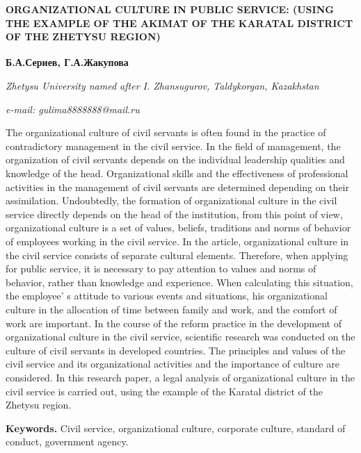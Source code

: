 \begin{articleheader}
{\bfseries ORGANIZATIONAL CULTURE IN PUBLIC SERVICE: (USING THE EXAMPLE OF THE AKIMAT OF THE KARATAL DISTRICT OF THE ZHETYSU REGION)}

{\bfseries
Б.А.Сериев,
Г.А.Жакупова\textsuperscript{\envelope }}
\end{articleheader}

\begin{affiliation}
\emph{Zhetysu University named after I. Zhansugurov, Taldykorgan, Kazakhstan}

\emph{e-mail: gulima8888888@mail.ru}
\end{affiliation}

The organizational culture of civil servants is often found in the
practice of contradictory management in the civil service. In the field
of management, the organization of civil servants depends on the
individual leadership qualities and knowledge of the head.
Organizational skills and the effectiveness of professional activities
in the management of civil servants are determined depending on their
assimilation. Undoubtedly, the formation of organizational culture in
the civil service directly depends on the head of the institution, from
this point of view, organizational culture is a set of values, beliefs,
traditions and norms of behavior of employees working in the civil
service. In the article, organizational culture in the civil service
consists of separate cultural elements. Therefore, when applying for
public service, it is necessary to pay attention to values and norms of
behavior, rather than knowledge and experience. When calculating this
situation, the employee' s attitude to various events and
situations, his organizational culture in the allocation of time between
family and work, and the comfort of work are important. In the course of
the reform practice in the development of organizational culture in the
civil service, scientific research was conducted on the culture of civil
servants in developed countries. The principles and values of the civil
service and its organizational activities and the importance of culture
are considered. In this research paper, a legal analysis of
organizational culture in the civil service is carried out, using the
example of the Karatal district of the Zhetysu region.

{\bfseries Keywords.} Civil service, organizational culture, corporate
culture, standard of conduct, government agency.

